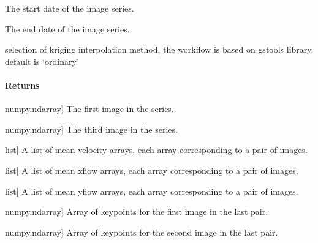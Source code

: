 \documentclass[letterpaper,10pt,english]{sphinxmanual}
\begin{document}
\begin{fulllineitems}
\begin{description}
\sphinxAtStartPar
The start date of the image series.

\sphinxAtStartPar
The end date of the image series.

\sphinxAtStartPar
selection of kriging interpolation method, the workflow is based on gstools library. default is ‘ordinary’

\end{description}


\paragraph{Returns}
\label{\detokenize{akhdefo_functions:id8}}\begin{description}
\sphinxlineitem{image1}{[}numpy.ndarray{]}
\sphinxAtStartPar
The first image in the series.

\sphinxlineitem{image3}{[}numpy.ndarray{]}
\sphinxAtStartPar
The third image in the series.

\sphinxlineitem{mean\_vel\_list}{[}list{]}
\sphinxAtStartPar
A list of mean velocity arrays, each array corresponding to a pair of images.

\sphinxlineitem{mean\_flowx\_list}{[}list{]}
\sphinxAtStartPar
A list of mean x\sphinxhyphen{}flow arrays, each array corresponding to a pair of images.

\sphinxlineitem{mean\_flowy\_list}{[}list{]}
\sphinxAtStartPar
A list of mean y\sphinxhyphen{}flow arrays, each array corresponding to a pair of images.

\sphinxlineitem{points1\_i}{[}numpy.ndarray{]}
\sphinxAtStartPar
Array of keypoints for the first image in the last pair.

\sphinxlineitem{points2}{[}numpy.ndarray{]}
\sphinxAtStartPar
Array of keypoints for the second image in the last pair.

\end{description}

\end{fulllineitems}


\begin{fulllineitems}
\label{\detokenize{akhdefo_functions:akhdefo_functions.Akhdefo_GOI.calculate_slopes_std_and_residuals}}
\pysigstartsignatures
{}
\pysigstopsignatures
\end{fulllineitems}
\end{document}
